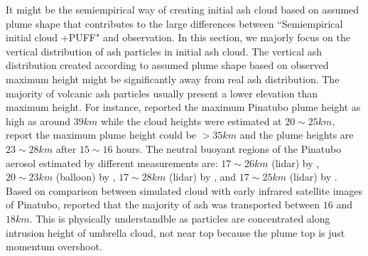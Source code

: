 It might be the semiempirical way of creating initial ash cloud based on assumed plume shape that contributes to the large differences between ``Semiempirical initial cloud +PUFF" and observation. In this section, we majorly focus on the vertical distribution of ash particles in initial ash cloud. The vertical ash distribution created according to assumed plume shape based on observed maximum height might be significantly away from real ash distribution.
The majority of volcanic ash particles usually present a lower elevation than maximum height. For instance, \citet{holasek1996satellite, holasek1996experiments} reported the maximum Pinatubo plume height as high as around $39 km$ while the cloud heights were estimated at $20 \sim 25 km $, \citet{self1993atmospheric} report the maximum plume height could be $>35 km$ and the plume heights are $23 \sim 28 km$ after $15 \sim 16$ hours. The neutral buoyant regions of the Pinatubo aerosol estimated by different measurements are: $17 \sim 26 km$ (lidar) by \citet{defoor1992early}, $20 \sim 23 km$ (balloon) by \citet{deshler1992balloonborne}, $17 \sim 28 km$ (lidar) by \citet{jager1992pinatubo}, and $17 \sim 25 km$ (lidar) by \citet{avdyushin19931}. Based on comparison between simulated cloud with early infrared satellite images of Pinatubo, \citet{fero2008simulation} reported that the majority of ash was transported between $16$ and $18 km$. This is physically understandble as particles are concentrated along intrusion height of umbrella cloud, not near top because the plume top is just momentum overshoot.

